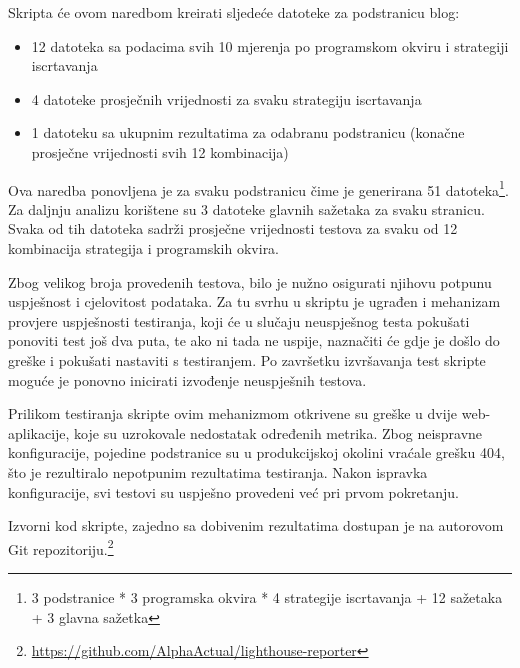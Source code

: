 \bigskip
Skripta će ovom naredbom kreirati sljedeće datoteke za podstranicu blog:
\begin{itemize}
    \item 12 datoteka sa podacima svih 10 mjerenja po programskom okviru i strategiji iscrtavanja
    \item 4 datoteke prosječnih vrijednosti za svaku strategiju iscrtavanja
    \item 1 datoteku sa ukupnim rezultatima za odabranu podstranicu (konačne prosječne vrijednosti svih 12 kombinacija)
\end{itemize}
Ova naredba ponovljena je za svaku podstranicu čime je generirana 51 datoteka\footnote{3 podstranice * 3 programska okvira * 4 strategije iscrtavanja + 12 sažetaka + 3 glavna sažetka}.
Za daljnju analizu korištene su 3 datoteke glavnih sažetaka za svaku stranicu. Svaka od tih datoteka sadrži prosječne vrijednosti testova za svaku od 12 kombinacija strategija i programskih okvira.

\bigskip

Zbog velikog broja provedenih testova, bilo je nužno osigurati njihovu potpunu uspješnost i cjelovitost podataka. Za tu svrhu u skriptu je ugrađen i mehanizam provjere uspješnosti testiranja, koji će u slučaju neuspješnog testa pokušati ponoviti test još dva puta, te ako ni tada ne uspije, naznačiti će gdje je došlo do greške i pokušati nastaviti s testiranjem. Po završetku izvršavanja test skripte moguće je ponovno inicirati izvođenje neuspješnih testova.

\bigskip

Prilikom testiranja skripte ovim mehanizmom otkrivene su greške u dvije web-aplikacije, koje su uzrokovale nedostatak određenih metrika. Zbog neispravne konfiguracije, pojedine podstranice su u produkcijskoj okolini vraćale grešku 404, što je rezultiralo nepotpunim rezultatima testiranja. Nakon ispravka konfiguracije, svi testovi su uspješno provedeni već pri prvom pokretanju.

\bigskip

Izvorni kod skripte, zajedno sa dobivenim rezultatima dostupan je na autorovom Git repozitoriju.\footnote{\url{https://github.com/AlphaActual/lighthouse-reporter}}

